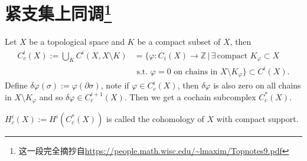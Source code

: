 
    \section[紧支集上同调]{紧支集上同调\footnote{这一段完全摘抄自\url{https://people.math.wisc.edu/~lmaxim/Topnotes9.pdf}}}
    Let \( X \) be a topological space and \( K \) be a compact subset of \( X \), then
    \begin{align*}
        C_c^i(X) := \bigcup_K C^i(X, X \setminus K) &= \Big\{\varphi : C_i(X) \to \mathbb{Z} \, \big| \, \exists \, \text{compact } K_\varphi \subset X \\
        &\text{ s.t. } \varphi = 0 \text{ on chains in } X \setminus K_\varphi\Big\} \subset C^i(X).
    \end{align*}
    Define \( \delta \varphi(\sigma) := \varphi(\partial\sigma) \), note if \( \varphi \in C_c^i(X) \), then \( \delta \varphi \) is also zero on all chains in \( X \setminus K_\varphi \) and so \( \delta \varphi \in C_c^{i+1}(X) \). Then we get a cochain subcomplex \( C_c^*(X) \).
    \begin{definition}
        $H_c^i(X) := H^i(C_c^*(X))$ is called the cohomology of $X$ with compact support.
    \end{definition}
    
